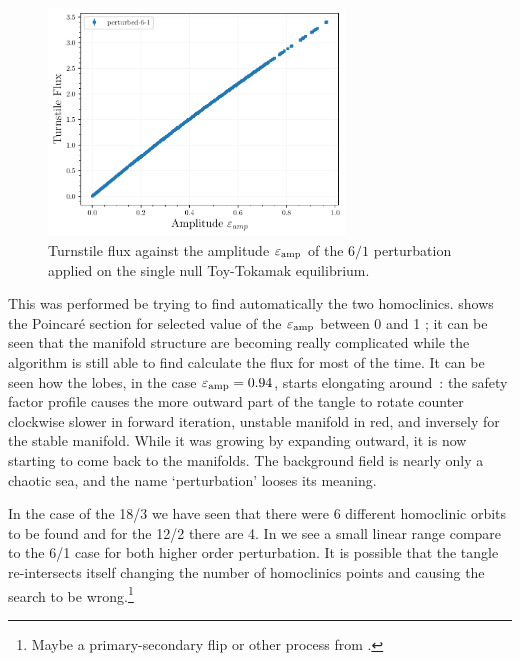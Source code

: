\begin{figure}[H]
    \centering
    \includegraphics[width=0.7\textwidth]{images/amplitudescan/turnstile_area_6_1.pdf}
    \caption{Turnstile flux against the amplitude $\varepsilon_\text{amp}$ of the $6/1$ perturbation applied on the single null Toy-Tokamak equilibrium.}
    \label{fig:scan-6-1}
\end{figure}

This was performed be trying to find automatically the two homoclinics.  shows the Poincaré section for selected value of the $\varepsilon_\text{amp}$ between 0 and 1 ; it can be seen that the manifold structure are becoming really complicated while the algorithm is still able to find calculate the flux for most of the time. It can be seen how the lobes, in the case $\varepsilon_\text{amp} = 0.94$, starts elongating around~: the safety factor profile causes the more outward part of the tangle to rotate counter clockwise slower in forward iteration, unstable manifold in red, and inversely for the stable manifold. While it was growing by expanding outward, it is now starting to come back to the manifolds. The background field is nearly only a chaotic sea, and the name `perturbation' looses its meaning.

In the case of the 18/3 we have seen that there were 6 different homoclinic orbits to be found and for the 12/2 there are 4. In  we see a small linear range compare to the 6/1 case for both higher order perturbation. It is possible that the tangle re-intersects itself changing the number of homoclinics points and causing the search to be wrong.\footnote{Maybe a primary-secondary flip or other process from \cite{hohloch_homoclinic_2017}.}

